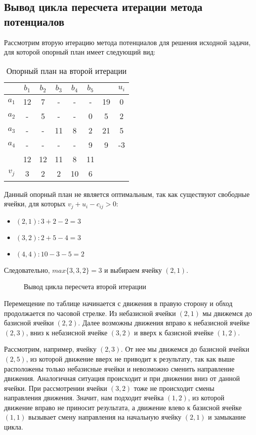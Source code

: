 \documentclass[../body.tex]{subfiles}
\begin{document}
\subsection{Вывод цикла пересчета итерации метода потенциалов}
Рассмотрим вторую итерацию метода потенциалов для решения исходной задачи, для которой опорный план имеет следующий вид:
\begin{table}[h]
    \centering
    \begin{tabular}{|c|c|c|c|c|c||c||c|}
        \hline
        & $b_1$ & $b_2$ & $b_3$ & $b_4$ & $b_5$ & & $u_i$\\\hline
        $a_1$ & 12 & 7 & - & - & - & 19 & 0\\\hline
        $a_2$ & - & 5 & - & - & 0 & 5 & 2\\\hline
        $a_3$ & - & - & 11 & 8 & 2 & 21 & 5\\\hline
        $a_4$ & - & - & - & - & 9 & 9 & -3\\\hline
        & 12 & 12 & 11 & 8 & 11 & &\\\hline
        $v_j$ & 3 & 2 & 2 & 10 & 6 & &\\\hline
    \end{tabular}
    \caption{Опорный план на второй итерации}
\end{table}

Данный опорный план не является оптимальным, так как существуют свободные ячейки, для которых $v_j+u_i-c_{ij}>0$:
\begin{itemize}
    \item $(2,1):3+2-2=3$
    \item $(3,2):2+5-4=3$
    \item $(4,4):10-3-5=2$
\end{itemize}

Следовательно, $max{\{3,3,2\}}=3$ и выбираем ячейку $(2,1)$.
\begin{figure}[h]
\caption{Вывод цикла пересчета второй итерации}
\label{fig:image}
\end{figure}

Перемещение по таблице начинается с движения в правую сторону и обход продолжается по часовой стрелке. Из небазисной ячейки $(2,1)$ мы движемся до базисной ячейки $(2,2)$. Далее возможны движения вправо к небазисной ячейке $(2,3)$, вниз к небазисной ячейке $(3,2)$ и вверх к базисной ячейке $(1,2)$.

Рассмотрим, например, ячейку $(2,3)$. От нее мы движемся до базисной ячейки $(2,5)$, из которой движение вверх не приводит к результату, так как выше расположены только небазисные ячейки и невозможно сменить направление движения. Аналогичная ситуация происходит и при движении вниз от данной ячейки. При рассмотрении ячейки $(3,2)$ тоже не происходит смены направления движения. Значит, нам подходит ячейка $(1,2)$, из которой движение вправо не приносит результата, а движение влево к базисной ячейке $(1,1)$ вызывает смену направления на начальную ячейку $(2,1)$ и замыкание цикла.
\end{document}
